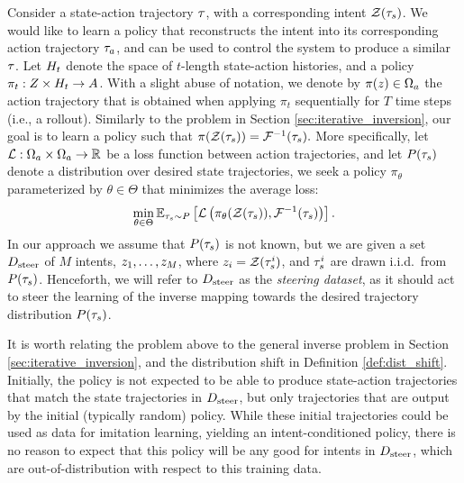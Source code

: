 \documentclass[nohyperref]{article}
\begin{document}
Consider a state-action trajectory $\tau$, with a corresponding intent $\mathcal{Z}(\tau_{s})$. We would like to learn a policy that reconstructs the intent into its corresponding action trajectory $\tau_{a}$, and can be used to control the system to produce a similar $\tau$. Let $H_t$ denote the space of $t$-length state-action histories, 
and a policy $\pi_t : Z \times H_t \to A$. With a slight abuse of notation, we denote by $\pi(z) \in \Omega_a$ the action trajectory that is obtained when applying $\pi_t$ sequentially for $T$ time steps (i.e., a rollout).
Similarly to the problem in Section \ref{sec:iterative_inversion}, our goal is to learn a policy such that 
$
    \pi(\mathcal{Z}(\tau_{s})) = \mathcal{F}^{-1}(\tau_{s}).
$
More specifically, let $\mathcal{L} : \Omega_a \times \Omega_a \to \mathbb{R}$ be a loss function between action trajectories, and let $P(\tau_{s})$ denote a distribution over desired state trajectories, we seek a policy $\pi_\theta$ parameterized by $\theta \in \Theta$ that minimizes the average loss:
\begin{equation}\label{eq:control_loss}
    \min_{\theta \in \Theta} \mathbb{E}_{\trajstate \sim P}\left[ \loss\left(\policy_{\theta}(\embed(\trajstate)), \mathcal{F}^{-1}(\trajstate)\right) \right].
    \vspace{-0.5em}
\end{equation}
In our approach we assume that $P(\tau_{s})$ is not known, but we are given a set $D_{\mathrm{steer}}$ of $M$ intents, $z_1,\dots, z_M$, where $z_i = \mathcal{Z}(\tau_{s}^i)$, and $\tau_{s}^i$ are drawn i.i.d.~from $P(\tau_{s})$. Henceforth, we will refer to $D_{\mathrm{steer}}$ as the \textit{steering dataset}, as it should act to steer the learning of the inverse mapping towards the desired trajectory distribution $P(\tau_{s})$. 

It is worth relating the problem above to the general inverse problem in Section \ref{sec:iterative_inversion}, and the distribution shift in Definition \ref{def:dist_shift}. Initially, the policy is not expected to be able to produce state-action trajectories that match the state trajectories in $D_{\mathrm{steer}}$, but only trajectories that are output by the initial (typically random) policy. While these initial trajectories could be used as data for imitation learning, yielding an intent-conditioned policy, there is no reason to expect that this policy will be any good for intents in $D_{\mathrm{steer}}$, which are out-of-distribution with respect to this training data.
\end{document}
